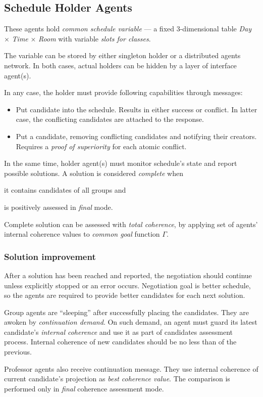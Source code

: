 \documentclass[../../ThesisDoc]{subfiles}
\begin{document}
\providecommand{\rootdir}{../..}


\subsection{Schedule Holder Agents}
\label{sec:solution-schedule-var}

These agents hold \emph{common schedule variable} --- a fixed 3-dimensional table
\emph{Day} $\times$ \emph{Time} $\times$ \emph{Room} with variable
\emph{slots for classes}.

The variable can be stored by either singleton holder or a distributed agents network.
In both cases, actual holders can be hidden by a layer of interface agent(s).

In any case, the holder must provide following capabilities through messages:
\begin{itemize}
  \item Put candidate into the schedule. Results in either success or conflict.
        In latter case, the conflicting candidates are attached to the response.
  \item Put a candidate, removing conflicting candidates and notifying their
        creators. Requires a \emph{proof of superiority} for each atomic conflict.
\end{itemize}

\medskip
\noindent
In the same time, holder agent(s) must monitor schedule's state and report
possible solutions. A solution is considered \emph{complete} when
\begin{enumerate*}
  \item it contains candidates of all groups and
  \item is positively assessed in \emph{final} mode.
\end{enumerate*}

Complete solution can be assessed with \emph{total coherence}, by applying
set of agents' internal coherence values to \emph{common goal} function $\Gamma$.

\subsubsection{Solution improvement}
\label{sec:solution-better}

After a solution has been reached and reported, the negotiation should continue
unless explicitly stopped or an error occurs. Negotiation goal is better
schedule, so the agents are required to provide better candidates for each next
solution.

Group agents are ``sleeping'' after successfully placing the candidates.
They are awoken by \emph{continuation demand}. On such demand, an agent
must guard its latest candidate's \emph{internal coherence} and use it as part
of candidates assessment process.
Internal coherence of new candidates should be no less than of the previous.

Professor agents also receive continuation message. They use internal coherence
of current candidate's projection as \emph{best coherence value}.
The comparison is performed only in \emph{final} coherence assessment mode.
\end{document}

